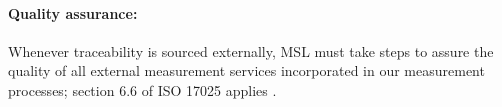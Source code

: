 {\paragraph{Quality assurance:}
Whenever traceability is sourced externally, MSL must take steps to assure the quality of all external measurement services incorporated in our measurement processes; section 6.6 of ISO 17025 applies \cite{ISO_17025}. 
 

}

